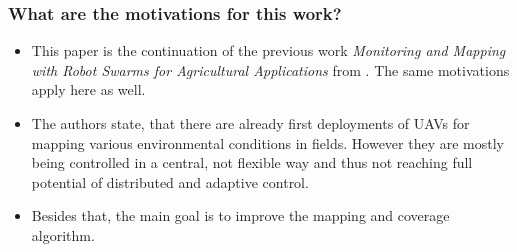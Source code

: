     \subsubsection*{What are the motivations for this work?}
    \begin{itemize}
        \item This paper is the continuation of the previous work \emph{Monitoring  and  Mapping with  Robot  Swarms  for  Agricultural  Applications} from \cite{Albani2017}. The same motivations apply here as well.
        \item The authors state, that there are already first deployments of UAVs for mapping various environmental conditions in fields. However they are mostly being controlled in a central, not flexible way and thus not reaching full potential of distributed and adaptive control.
        \item Besides that, the main goal is to improve the mapping and coverage algorithm.
    \end{itemize}
